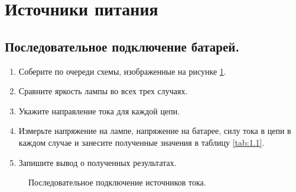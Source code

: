 \section{Источники питания}


\subsection{Последовательное подключение батарей.}

\begin{enumerate}
    \item Соберите по очереди схемы, изображенные на рисунке \ref{ris:image1}.
    \item Сравните яркость лампы во всех трех случаях.
    \item Укажите направление тока для каждой цепи.
    \item Измерьте напряжение на лампе, напряжение на батарее, силу тока в цепи в каждом случае и занесите полученные значения в таблицу \ref{tab:1.1}.
    \item Запишите вывод о полученных результатах.
\end{enumerate}

\begin{figure}[h]
\begin{minipage}[h]{0.3\linewidth}
\end{minipage}
\hfill
\begin{minipage}[h]{0.3\linewidth}
\end{minipage}
\hfill
\begin{minipage}[h]{0.3\linewidth}
\end{minipage}
\caption{Последовательное подключение источников тока.}
\label{ris:image1}
\end{figure}


